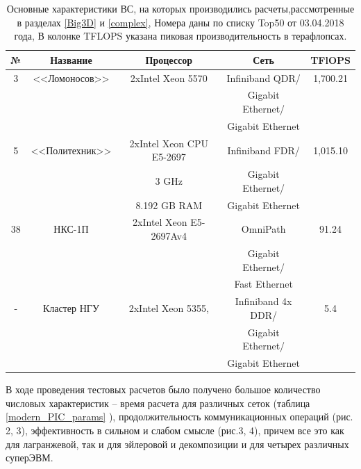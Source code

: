 \begin{table}[ht]
	\caption{
		Основные характеристики ВС, на которых производились расчеты,рассмотренные в разделах \ref{Big3D} и \ref{complex}, Номера даны по списку Top50 от 03.04.2018 года, В колонке TFLOPS указана пиковая производительность в терафлопсах.}
	\begin{center}
		\begin{tabular}{|c|c|c|c|c|}
			\hline
			
			№ & Название       & Процессор                & Сеть                &  TFlOPS\\
			\hline 
			3 & <<Ломоносов>>  &  2xIntel Xeon 5570       &  Infiniband QDR/   &   1,700.21 \\
			&                &                          &  Gigabit Ethernet/ &            \\
			&                &                          &  Gigabit Ethernet  &            \\ \hline
			
			5 & <<Политехник>> & 2xIntel Xeon CPU E5-2697 &  Infiniband FDR/   &   1,015.10 \\
			&                & 3 GHz                    &  Gigabit Ethernet/ &            \\
			&                & 8.192 GB RAM             &  Gigabit Ethernet  &            \\ \hline
			
			38& НКС-1П         & 2xIntel Xeon E5-2697Av4  & OmniPath           & 91.24      \\
			&                 &                          & Gigabit Ethernet/  &            \\
			&                 &                          & Fast Ethernet      &            \\ \hline
			
			- & Кластер НГУ    & 2xIntel Xeon 5355,       &  Infiniband 4x DDR/& 5.4 \\ 
			&			       &                          &   Gigabit Ethernet/&  \\
			&			       &                          &   Gigabit Ethernet &  \\ \hline                    
			
		\end{tabular}
	\end{center}
	\label{top50_2018}
\end{table}


В ходе проведения тестовых расчетов было получено большое количество числовых характеристик – время расчета для различных сеток (таблица \ref{modern_PIC_params} ), продолжительность коммуникационных операций (рис. 2, 3), эффективность в сильном и слабом смысле (рис.3, 4), причем все это как для лагранжевой, так и для эйлеровой и декомпозиции и для четырех различных суперЭВМ. 







